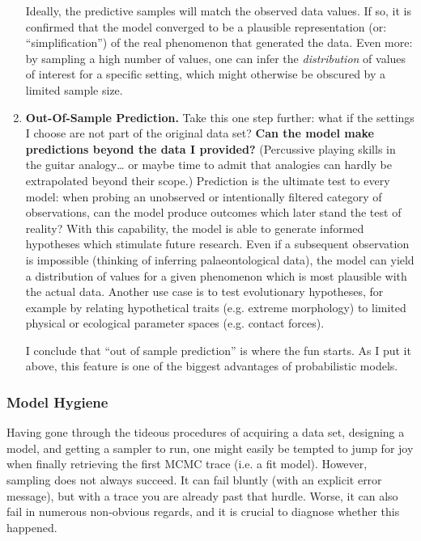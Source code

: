 \begin{enumerate}
Ideally, the predictive samples will match the observed data values.
If so, it is confirmed that the model converged to be a plausible representation (or: ``simplification'') of the real phenomenon that generated the data.
Even more: by sampling a high number of values, one can infer the \emph{distribution} of values of interest for a specific setting, which might otherwise be obscured by a limited sample size.


\item \textbf{Out-Of-Sample Prediction.}
\label{sec:org7e10c89}
Take this one step further: what if the settings I choose are not part of the original data set?
\textbf{Can the model make predictions beyond the data I provided?}
(Percussive playing skills in the guitar analogy\ldots{} or maybe time to admit that analogies can hardly be extrapolated beyond their scope.)
Prediction is the ultimate test to every model: when probing an unobserved or intentionally filtered category of observations, can the model produce outcomes which later stand the test of reality?
With this capability, the model is able to generate informed hypotheses which stimulate future research.
Even if a subsequent observation is impossible (thinking of inferring palaeontological data), the model can yield a distribution of values for a given phenomenon which is most plausible with the actual data.
Another use case is to test evolutionary hypotheses, for example by relating hypothetical traits (e.g. extreme morphology) to limited physical or ecological parameter spaces (e.g. contact forces).

I conclude that ``out of sample prediction'' is where the fun starts.
As I put it above, this feature is one of the biggest advantages of probabilistic models.
\end{enumerate}


\subsubsection{Model Hygiene}
\label{workflow:hygiene}
Having gone through the tideous procedures of acquiring a data set, designing a model, and getting a sampler to run, one might easily be tempted to jump for joy when finally retrieving the first MCMC trace (i.e. a fit model).
However, sampling does not always succeed.
It can fail bluntly (with an explicit error message), but with a trace you are already past that hurdle.
Worse, it can also fail in numerous non-obvious regards, and it is crucial to diagnose whether this happened.

